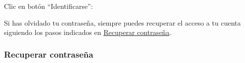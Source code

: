 \documentclass[12pt, spanish]{article}
\begin{document}
\begin{steps}
        \item Clic en botón ``Identificarse'':

            \medskip
            \begin{minipage}[t]{\linewidth}
            \raggedright
        \end{minipage}

    \end{steps}

        Si has olvidado tu contraseña, siempre puedes recuperar el acceso a tu cuenta
    siguiendo los pasos indicados en \hyperref[sec:forgot-password]{Recuperar contraseña}.


    \subsubsection{Recuperar contraseña}

    \label{sec:forgot-password}
\end{document}
